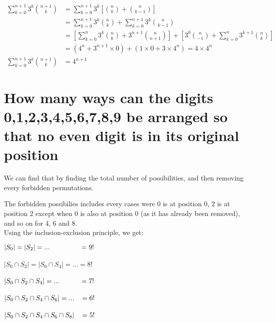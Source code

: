 \documentclass{article}
\begin{document}
\begin{align}
    \sum_{k=0}^{n+1}{3^k\binom{n+1}{k}} &= \sum_{k=0}^{n+1}{3^k\left[\binom{n}{k}+\binom{n}{k-1}\right]}\\
    &= \sum_{k=0}^{n+1}{3^k\binom{n}{k}}+\sum_{k=0}^{n+1}{3^k\binom{n}{k-1}}\\
    &= \left[\sum_{k=0}^{n}{3^k\binom{n}{k}}+3^{n+1}\binom{n}{n+1}\right] + \left[3^0\binom{n}{-1}+\sum_{k=0}^{n}{3^{k+1}\binom{n}{k}}\right]\\
    &= (4^n+3^{n+1}\times0) + (1\times0+3\times4^n) = 4 \times 4^n\\
    \sum_{k=0}^{n+1}{3^k\binom{n+1}{k}} &= 4^{n+1}
\end{align}


\break\vfill
\section{How many ways can the digits 0,1,2,3,4,5,6,7,8,9 be arranged so that no even digit is in its original position}

We can find that by finding the total number of possibilities, and then removing every forbidden permutations.

The forbidden possibilies includes every cases were 0 is at position 0, 2 is at position 2 except when 0 is also at position 0 (as it has already been removed), and so on for 4, 6 and 8.\\
Using the inclusion-exclusion principle, we get:\vspace*{0.5em}

\hspace*{0.0em}$ |S_0| = |S_2| = ... \hspace*{4.4em}= 9! $\\\vspace*{-1em}\\
\hspace*{1.5em}$ |S_0 \cap S_2| = |S_0 \cap S_4| = ... = 8! $\\\vspace*{-1em}\\
\hspace*{1.5em}$ |S_0 \cap S_2 \cap S_4| = ...\hspace*{3em}= 7! $\\\vspace*{-1em}\\
\hspace*{1.5em}$ |S_0 \cap S_2 \cap S_4 \cap S_6| = ...\hspace*{0.9em}= 6! $\\\vspace*{-1em}\\
\hspace*{1.5em}$ |S_0 \cap S_2 \cap S_4 \cap S_6 \cap S_8|\hspace*{0.9em}= 5! $\\\vspace*{-1em}
\end{document}
